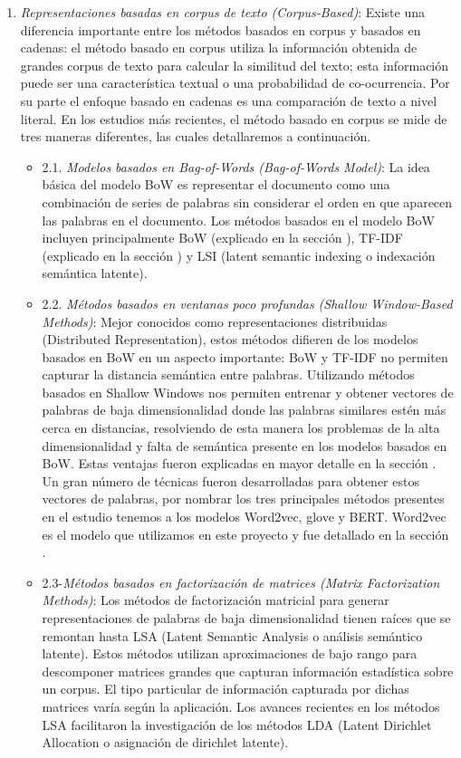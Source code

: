 \documentclass[12pt,a4paper]{article}
\begin{document}
\begin{sloppypar}
\begin{enumerate}
\item \textit{Representaciones basadas en corpus de texto (Corpus-Based)}: Existe una diferencia importante entre los métodos basados en corpus y basados en cadenas: el método basado en corpus utiliza la información obtenida de grandes corpus de texto para calcular la similitud del texto; esta información puede ser una característica textual o una probabilidad de co-ocurrencia. Por su parte el enfoque basado en cadenas es una comparación de texto a nivel literal. En los estudios más recientes, el método basado en corpus se mide de tres maneras diferentes, las cuales detallaremos a continuación. 

\begin{itemize}
\item 2.1. \textit{Modelos basados en Bag-of-Words (Bag-of-Words Model)}:  La idea básica del modelo BoW es representar el documento como una combinación de series de palabras sin considerar el orden en que aparecen las palabras en el documento. Los métodos basados en el modelo BoW incluyen principalmente BoW (explicado en la sección \textit{}), TF-IDF (explicado en la sección \textit{}) y LSI (latent semantic indexing o indexación semántica latente).

\item 2.2. \textit{Métodos basados en ventanas poco profundas (Shallow Window-Based Methods)}: Mejor conocidos como representaciones distribuidas (Distributed Representation), estos métodos difieren de los modelos basados en BoW en un aspecto importante: BoW y TF-IDF no permiten capturar la distancia semántica entre palabras. Utilizando métodos basados en Shallow Windows nos permiten entrenar y obtener vectores de palabras de baja dimensionalidad donde las palabras similares estén más cerca en distancias, resolviendo de esta manera los problemas de la alta dimensionalidad y falta de semántica presente en los modelos basados en BoW. Estas ventajas fueron explicadas en mayor detalle en la sección \textit{}. Un gran número de técnicas fueron desarrolladas para obtener estos vectores de palabras, por nombrar los tres principales métodos presentes en el estudio tenemos a los modelos Word2vec, glove y BERT. Word2vec es el modelo que utilizamos en este proyecto y fue detallado en la sección \textit{}.

\item 2.3-\textit{Métodos basados en factorización de matrices (Matrix Factorization Methods)}: Los métodos de factorización matricial para generar representaciones de palabras de baja dimensionalidad tienen raíces que se remontan hasta LSA (Latent Semantic Analysis o análisis semántico latente). Estos métodos utilizan aproximaciones de bajo rango para descomponer matrices grandes que capturan información estadística sobre un corpus. El tipo particular de información capturada por dichas matrices varía según la aplicación. Los avances recientes en los métodos LSA facilitaron la investigación de los métodos LDA (Latent Dirichlet Allocation o asignación de dirichlet latente).
\end{itemize}


\end{enumerate}
\end{sloppypar}
\end{document}
